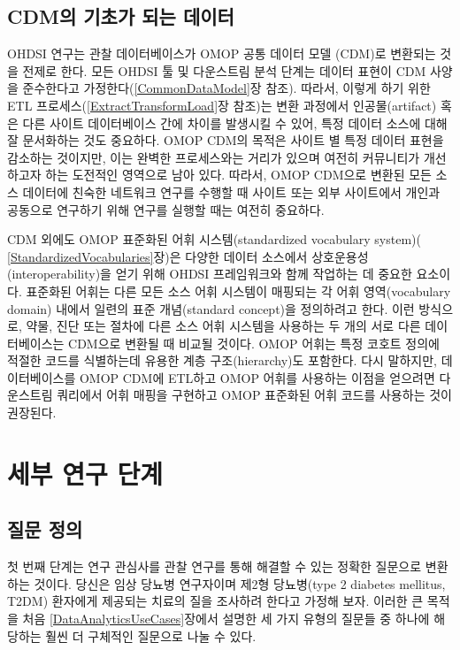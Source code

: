 \documentclass[11pt]{book}
\theoremstyle{definition}
\theoremstyle{definition}
\theoremstyle{definition}
\theoremstyle{remark}
\begin{document}
\subsection{CDM의 기초가 되는 데이터}\label{cdm---}

OHDSI 연구는 관찰 데이터베이스가 OMOP 공통 데이터 모델 (CDM)로 변환되는
것을 전제로 한다. 모든 OHDSI 툴 및 다운스트림 분석 단계는 데이터 표현이
CDM 사양을 준수한다고 가정한다(\ref{CommonDataModel}장 참조). 따라서,
이렇게 하기 위한 ETL 프로세스(\ref{ExtractTransformLoad}장 참조)는 변환
과정에서 인공물(artifact) 혹은 다른 사이트 데이터베이스 간에 차이를
발생시킬 수 있어, 특정 데이터 소스에 대해 잘 문서화하는 것도 중요하다.
OMOP CDM의 목적은 사이트 별 특정 데이터 표현을 감소하는 것이지만, 이는
완벽한 프로세스와는 거리가 있으며 여전히 커뮤니티가 개선하고자 하는
도전적인 영역으로 남아 있다. 따라서, OMOP CDM으로 변환된 모든 소스
데이터에 친숙한 네트워크 연구를 수행할 때 사이트 또는 외부 사이트에서
개인과 공동으로 연구하기 위해 연구를 실행할 때는 여전히 중요하다.

CDM 외에도 OMOP 표준화된 어휘 시스템(standardized vocabulary system)(
\ref{StandardizedVocabularies}장)은 다양한 데이터 소스에서
상호운용성(interoperability)을 얻기 위해 OHDSI 프레임워크와 함께
작업하는 데 중요한 요소이다. 표준화된 어휘는 다른 모든 소스 어휘
시스템이 매핑되는 각 어휘 영역(vocabulary domain) 내에서 일련의 표준
개념(standard concept)을 정의하려고 한다. 이런 방식으로, 약물, 진단 또는
절차에 다른 소스 어휘 시스템을 사용하는 두 개의 서로 다른 데이터베이스는
CDM으로 변환될 때 비교될 것이다. OMOP 어휘는 특정 코호트 정의에 적절한
코드를 식별하는데 유용한 계층 구조(hierarchy)도 포함한다. 다시 말하지만,
데이터베이스를 OMOP CDM에 ETL하고 OMOP 어휘를 사용하는 이점을 얻으려면
다운스트림 쿼리에서 어휘 매핑을 구현하고 OMOP 표준화된 어휘 코드를
사용하는 것이 권장된다.

\section{세부 연구 단계}\label{--}

\subsection{질문 정의}\label{-}

첫 번째 단계는 연구 관심사를 관찰 연구를 통해 해결할 수 있는 정확한
질문으로 변환하는 것이다. 당신은 임상 당뇨병 연구자이며 제2형
당뇨병(type 2 diabetes mellitus, T2DM) 환자에게 제공되는 치료의 질을
조사하려 한다고 가정해 보자. 이러한 큰 목적을 처음
\ref{DataAnalyticsUseCases}장에서 설명한 세 가지 유형의 질문들 중 하나에
해당하는 훨씬 더 구체적인 질문으로 나눌 수 있다.
\end{document}
